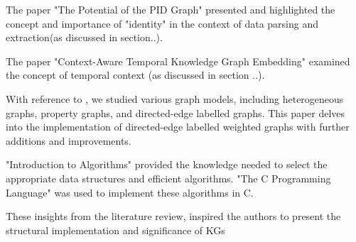 \documentclass[conference]{IEEEtran}
\begin{document}
The paper "The Potential of the PID Graph" \cite{b16} presented and highlighted the concept and importance of "identity" in the context of data parsing and extraction(as discussed in section..).

The paper "Context-Aware Temporal Knowledge Graph Embedding" \cite{b17} examined the concept of temporal context (as discussed in section ..).

With reference to \cite{b8}, we studied various graph models, including heterogeneous graphs\cite{b18}, property graphs\cite{b12}, and directed-edge labelled graphs\cite{b8}. This paper delves into the implementation of directed-edge labelled weighted graphs with further additions and improvements.

"Introduction to Algorithms" \cite{b14} provided the knowledge needed to select the appropriate data structures and efficient algorithms. "The C Programming Language" \cite{b9} was used to implement these algorithms in C.

These insights from the literature review, inspired the authors to present the structural implementation and significance of KGs
\end{document}
